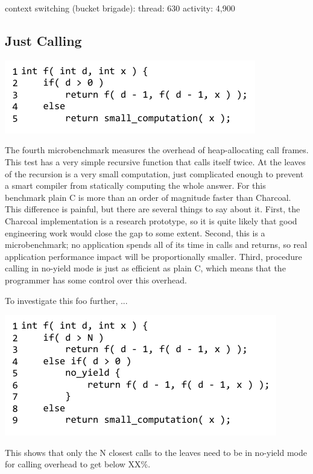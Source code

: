 \documentclass[10pt,preprint]{sigplanconf}
\begin{document}
context switching (bucket brigade): thread: 630  activity: 4,900

\subsection{Just Calling}

{\raggedleft \includegraphics{just_calling_benchmark}}


The fourth microbenchmark measures the overhead of heap-allocating call frames.
This test has a very simple recursive function that calls itself twice.
At the leaves of the recursion is a very small computation, just complicated enough to prevent a smart compiler from statically computing the whole answer.
For this benchmark plain C is more than an order of magnitude faster than Charcoal.
This difference is painful, but there are several things to say about it.
First, the Charcoal implementation is a research prototype, so it is quite likely that good engineering work would close the gap to some extent.
Second, this is a microbenchmark; no application spends all of its time in calls and returns, so real application performance impact will be proportionally smaller.
Third, procedure calling in no-yield mode is just as efficient as plain C, which means that the programmer has some control over this overhead.

To investigate this foo further, ...

{\raggedleft \includegraphics{just_calling_n_benchmark}}

This shows that only the N closest calls to the leaves need to be in no-yield mode for calling overhead to get below XX\%.
\end{document}
